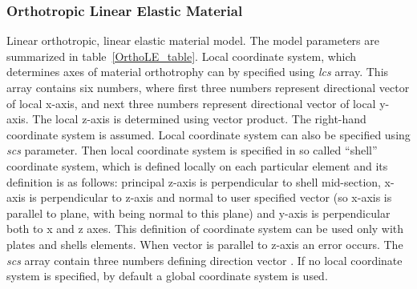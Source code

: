 \documentclass[epsf,a4paper]{article}
\newcommand{\param}[1]{{\it #1}}
\begin{document}
\subsubsection{Orthotropic Linear Elastic Material}
\label{OrthoLE}
Linear orthotropic, linear elastic  material model. The model parameters are summarized
in table~\ref{OrthoLE_table}.
Local coordinate system, which determines axes of material orthotrophy
can by specified using \param{lcs} array. This array contains six numbers,
where first three numbers represent directional vector of local
x-axis, and next three numbers represent directional vector of local
y-axis. The local z-axis is determined using vector product. 
The right-hand coordinate system is assumed. Local coordinate system
can also be specified using \param{scs} parameter. Then local coordinate
system is specified in so called ``shell''
coordinate system, which is defined locally on each particular element
and its definition is as follows: principal z-axis is perpendicular to
shell mid-section, x-axis is perpendicular to z-axis and normal to
user specified vector (so x-axis is parallel to plane, with  being
normal to this plane) and y-axis is perpendicular both to x and z
axes. This definition of coordinate system can be used only with plates
and shells elements. 
When vector  is parallel to z-axis an error occurs. The \param{scs} array contain three numbers
defining direction vector . If no local coordinate system is
specified, by default a global coordinate system is used. 
\end{document}
